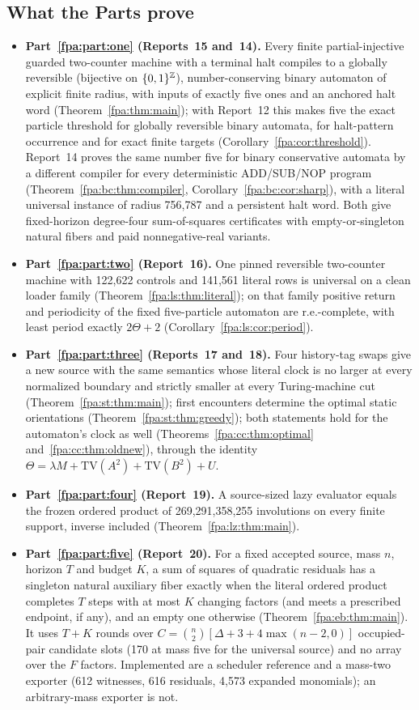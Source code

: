 \documentclass[11pt,a4paper]{article}
\numberwithin{equation}{section}
\begin{document}
\subsection{What the Parts prove}\label{fpa:sec:overview}
\begin{itemize}
\item \textbf{Part~\ref{fpa:part:one} (Reports~15 and~14).} Every finite partial-injective guarded two-counter machine with a terminal halt compiles to a globally reversible (bijective on $\{0,1\}^{\mathbb Z}$), number-conserving binary automaton of explicit finite radius, with inputs of exactly five ones and an anchored halt word (Theorem~\ref{fpa:thm:main}); with Report~12 this makes five the exact particle threshold for globally reversible binary automata, for halt-pattern occurrence and for exact finite targets (Corollary~\ref{fpa:cor:threshold}). Report~14 proves the same number five for binary conservative automata by a different compiler for every deterministic ADD/SUB/NOP program (Theorem~\ref{fpa:bc:thm:compiler}, Corollary~\ref{fpa:bc:cor:sharp}), with a literal universal instance of radius 756,787 and a persistent halt word. Both give fixed-horizon degree-four sum-of-squares certificates with empty-or-singleton natural fibers and paid nonnegative-real variants.
\item \textbf{Part~\ref{fpa:part:two} (Report~16).} One pinned reversible two-counter machine with 122,622 controls and 141,561 literal rows is universal on a clean loader family (Theorem~\ref{fpa:ls:thm:literal}); on that family positive return and periodicity of the fixed five-particle automaton are r.e.-complete, with least period exactly $2\Theta+2$ (Corollary~\ref{fpa:ls:cor:period}).
\item \textbf{Part~\ref{fpa:part:three} (Reports~17 and~18).} Four history-tag swaps give a new source with the same semantics whose literal clock is no larger at every normalized boundary and strictly smaller at every Turing-machine cut (Theorem~\ref{fpa:st:thm:main}); first encounters determine the optimal static orientations (Theorem~\ref{fpa:st:thm:greedy}); both statements hold for the automaton's clock as well (Theorems~\ref{fpa:cc:thm:optimal} and~\ref{fpa:cc:thm:oldnew}), through the identity $\Theta=\lambda M+\mathrm{TV}(A^2)+\mathrm{TV}(B^2)+U$.
\item \textbf{Part~\ref{fpa:part:four} (Report~19).} A source-sized lazy evaluator equals the frozen ordered product of 269,291,358,255 involutions on every finite support, inverse included (Theorem~\ref{fpa:lz:thm:main}).
\item \textbf{Part~\ref{fpa:part:five} (Report~20).} For a fixed accepted source, mass $n$, horizon $T$ and budget $K$, a sum of squares of quadratic residuals has a singleton natural auxiliary fiber exactly when the literal ordered product completes $T$ steps with at most $K$ changing factors (and meets a prescribed endpoint, if any), and an empty one otherwise (Theorem~\ref{fpa:eb:thm:main}). It uses $T+K$ rounds over $C=\binom n2[\Delta+3+4\max(n-2,0)]$ occupied-pair candidate slots (170 at mass five for the universal source) and no array over the $F$ factors. Implemented are a scheduler reference and a mass-two exporter (612 witnesses, 616 residuals, 4,573 expanded monomials); an arbitrary-mass exporter is not.

\end{itemize}
\end{document}
